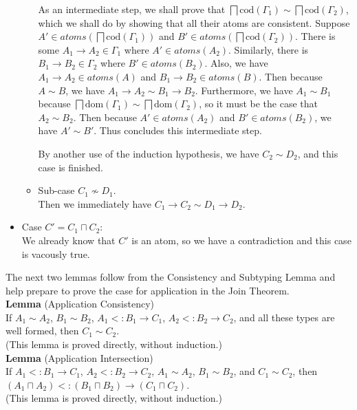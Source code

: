 \documentclass{article}
\newcommand{\ATOMS}[1]{\mathit{atoms}(#1)}
\newcommand{\sqinter}[0]{\bigsqcap}
\begin{document}
\begin{itemize}
\begin{itemize}
    As an intermediate step, we shall prove that
    $\sqinter \mathrm{cod}(\Gamma_1) \sim \sqinter \mathrm{cod}(\Gamma_2)$,
    which we shall do by showing that all their atoms are consistent.
    Suppose $A' \in \ATOMS{\sqinter \mathrm{cod}(\Gamma_1)}$
    and $B' \in \ATOMS{\sqinter \mathrm{cod}(\Gamma_2)}$.
    There is some $A_1\to A_2 \in \Gamma_1$ where $A' \in \ATOMS{A_2}$.
    Similarly, there is $B_1 \to B_2 \in \Gamma_2$ where $B' \in \ATOMS{B_2}$.
    Also, we have $A_1 \to A_2 \in \ATOMS{A}$ and $B_1 \to B_2 \in \ATOMS{B}$.
    Then because $A \sim B$, we have $A_1 \to A_2 \sim B_1 \to B_2$.
    Furthermore, we have $A_1 \sim B_1$ because
    $\sqinter \mathrm{dom}(\Gamma_1) \sim \sqinter \mathrm{dom}(\Gamma_2)$,
    so it must be the case that $A_2 \sim B_2$.
    Then because $A' \in \ATOMS{A_2}$ and $B' \in \ATOMS{B_2}$, we
    have $A' \sim B'$. Thus concludes this intermediate step.

    By another use of the induction hypothesis, we have
    $C_2 \sim D_2$, and this case is finished.
    
  \item Sub-case $C_1 \not\sim D_1$.\\
    Then we immediately have $C_1 \to C_2 \sim D_1 \to D_2$.
  \end{itemize}
  
\item Case $C'=C_1\sqcap C_2$:\\
  We already know that $C'$ is an atom, so we have a contradiction
  and this case is vacously true.
\end{itemize}

The next two lemmas follow from the Consistency and Subtyping Lemma
and help prepare to prove the case for application in the Join
Theorem. \\

\noindent \textbf{Lemma} (Application Consistency) \\
%
If $A_1 \sim A_2$, $B_1 \sim B_2$, $A_1 <: B_1 \to C_1$,
$A_2 <: B_2 \to C_2$, and all these types are well formed,
then $C_1 \sim C_2$.\\
(This lemma is proved directly, without induction.)\\

\noindent \textbf{Lemma} (Application Intersection) \\
%
If $A_1 <: B_1 \to C_1$, $A_2 <: B_2 \to C_2$, $A_1 \sim A_2$,
$B_1 \sim B_2$, and $C_1 \sim C_2$, then
$(A_1\sqcap A_2) <: (B_1 \sqcap B_2) \to (C_1 \sqcap C_2)$.\\
(This lemma is proved directly, without induction.) \\
\end{document}
